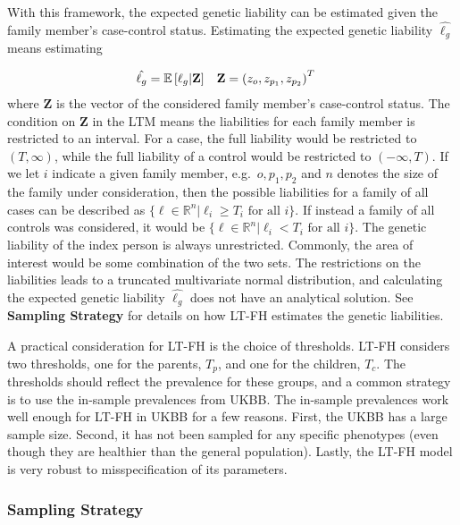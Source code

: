 With this framework, the expected genetic liability can be estimated given the family member's case-control status. Estimating the expected genetic liability $ \hat{\ell_g} $ means estimating 

\begin{align*}
\hat{\ell_g} = \mathbb{E} \left[ \ell_g | \mathbf{Z} \right] & & & \mathbf{Z} = \left(z_o, z_{p_1}, z_{p_2} \right)^T
\end{align*}
where $ \mathbf{Z} $ is the vector of the considered family member's case-control status. The condition on $ \mathbf{Z} $ in the LTM means the liabilities for each family member is restricted to an interval. For a case, the full liability would be restricted to $ (T, \infty) $, while the full liability of a control would be restricted to $ (-\infty, T) $. If we let $ i $ indicate a given family member, e.g.\ $ o, p_1, p_2 $ and $ n $ denotes the size of the family under consideration, then the possible liabilities for a family of all cases can be described as $ \{ \ell \in \mathbb{R}^n | \ell_i \geq T_i \text{ for all } i\} $. If instead a family of all controls was considered, it would be $ \{ \ell \in \mathbb{R}^n | \ell_i < T_i \text{ for all } i\} $. The genetic liability of the index person is always unrestricted. Commonly, the area of interest would be some combination of the two sets. The restrictions on the liabilities leads to a truncated multivariate normal distribution, and calculating the expected genetic liability $ \hat{\ell_g} $ does not have an analytical solution. See \textbf{Sampling Strategy} for details on how LT-FH estimates the genetic liabilities. 

A practical consideration for LT-FH is the choice of thresholds. LT-FH considers two thresholds, one for the parents, $ T_p $, and one for the children, $ T_c $. The thresholds should reflect the prevalence for these groups, and a common strategy is to use the in-sample prevalences from UKBB. The in-sample prevalences work well enough for LT-FH in UKBB for a few reasons. First, the UKBB has a large sample size. Second, it has not been sampled for any specific phenotypes (even though they are healthier than the general population). Lastly, the LT-FH model is very robust to misspecification of its parameters.

\subsubsection{Sampling Strategy}

